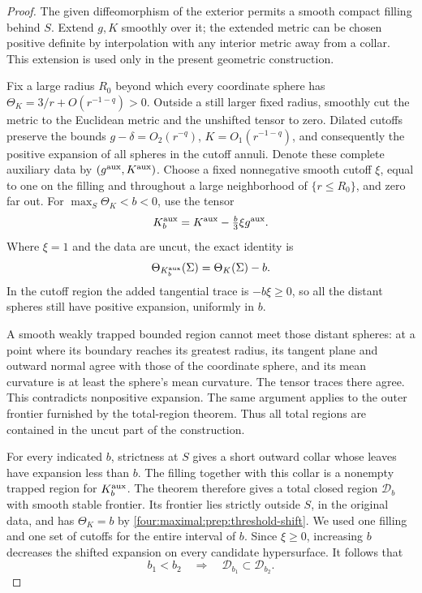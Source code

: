 \begin{proof}
The given diffeomorphism of the exterior permits a smooth compact
filling behind \(S\).  Extend \(g,K\) smoothly over it; the
extended metric can be chosen positive definite by interpolation
with any interior metric away from a collar.  This extension is used
only in the present geometric construction.

Fix a large radius \(R_0\) beyond which every coordinate sphere has
\(\Theta_K=3/r+O(r^{-1-q})>0\).  Outside a still larger fixed
radius, smoothly cut the metric to the Euclidean metric and the
unshifted tensor to zero.  Dilated cutoffs preserve the bounds
\(g-\delta=O_2(r^{-q})\), \(K=O_1(r^{-1-q})\), and consequently
the positive expansion of all spheres in the cutoff annuli.  Denote
these complete auxiliary data by \((g^{\rm aux},K^{\rm aux})\).
Choose a fixed nonnegative smooth cutoff \(\xi\), equal to one
on the filling and throughout a large neighborhood of \(\{r\le
R_0\}\), and zero far out.  For
\(\max_S\Theta_K<b<0\), use the tensor
\[
 K_b^{\rm aux}=K^{\rm aux}-\tfrac b3\xi g^{\rm aux}.
\]
Where \(\xi=1\) and the data are uncut, the exact identity is
\begin{equation}
 \Theta_{K_b^{\rm aux}}(\Sigma)=\Theta_K(\Sigma)-b.
\label{four:maximal:prep:threshold-shift}
\end{equation}
In the cutoff region the added tangential trace is \(-b\xi\ge0\),
so all the distant spheres still have positive expansion, uniformly
in \(b\).

A smooth weakly trapped bounded region cannot meet those distant
spheres: at a point where its boundary reaches its greatest radius,
its tangent plane and outward normal agree with those of the
coordinate sphere, and its mean curvature is at least the sphere's
mean curvature.  The tensor traces there agree.  This contradicts
nonpositive expansion.  The same argument applies to the outer
frontier furnished by the total-region theorem.  Thus all total
regions are contained in the uncut part of the construction.

For every indicated \(b\), strictness at \(S\) gives a short
outward collar whose leaves have expansion less than \(b\).
The filling together with this collar is a nonempty trapped region
for \(K_b^{\rm aux}\).  The theorem therefore gives a total closed
region \(\mathcal D_b\) with smooth stable frontier.  Its frontier
lies strictly outside \(S\), in the original data, and has
\(\Theta_K=b\) by \eqref{four:maximal:prep:threshold-shift}.
We used one filling and one set of cutoffs for the entire interval
of \(b\).  Since \(\xi\ge0\), increasing \(b\) decreases
the shifted expansion on every candidate hypersurface.  It follows
that
\begin{equation}
 b_1<b_2\quad\Longrightarrow\quad
                 \mathcal D_{b_1}\subset\mathcal D_{b_2}.
\label{four:maximal:prep:threshold-monotonicity}
\end{equation}


\end{proof}
